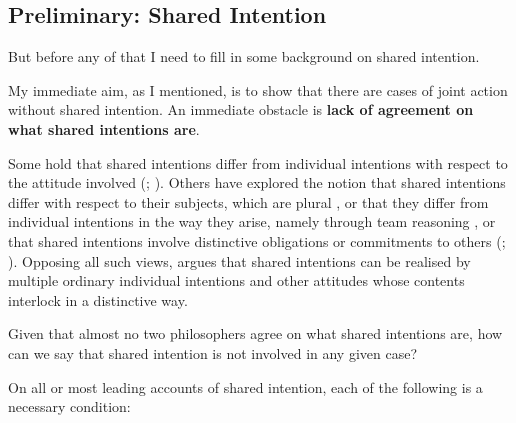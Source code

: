 \documentclass[12pt,a4paper]{extarticle}
\begin{document}
\subsection{Preliminary: Shared Intention}

But before any of that I need to fill in some background on shared intention.

My immediate aim, as I mentioned, is to show that there are cases of joint action without shared intention.  An immediate obstacle is \textbf{lack of agreement on what shared intentions are}.  

Some hold that shared intentions differ from individual intentions with respect to the attitude involved (\citealp{Kutz:2000si}; \citealp{Searle:1990em}). 
Others have explored the notion that shared intentions differ with respect to their subjects, which are plural \citep{Gilbert:1992rs}, 
or that they differ from individual intentions in the way they arise, namely through team reasoning \citep{Gold:2007zd}, 
or that shared intentions involve distinctive obligations or commitments to others (\citealp{Gilbert:1992rs}; \citealp{Roth:2004ki}).
Opposing all such views, \citet{Bratman:1992mi,Bratman:2009lv} argues that shared intentions can be realised by multiple ordinary individual intentions and other attitudes whose contents interlock in a distinctive way. 

Given that almost no two philosophers agree on what shared intentions are, how can we say that shared intention is not involved in any given case?  

On all or most leading accounts of shared intention, each of the following is a necessary condition:
\end{document}

